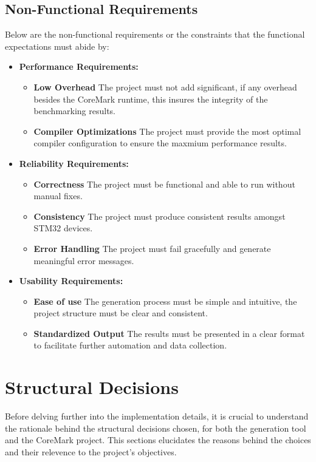 \subsection{Non-Functional Requirements}
Below are the non-functional requirements or the constraints that the functional expectations must abide by:
\begin{itemize}
    \item \textbf{Performance Requirements:}
    \begin{itemize}
        \item \textbf{Low Overhead} The project must not add significant, if any overhead besides the CoreMark runtime, this insures the integrity of the benchmarking results.
        \item \textbf{Compiler Optimizations} The project must provide the most optimal compiler configuration to ensure the maxmium performance results.
    \end{itemize}
   \item \textbf{Reliability Requirements:}
   \begin{itemize}
    \item \textbf{Correctness} The project must be functional and able to run without manual fixes.
    \item \textbf{Consistency} The project must produce consistent results amongst STM32 devices.
    \item \textbf{Error Handling} The project must fail gracefully and generate meaningful error messages.
   \end{itemize}
   \item \textbf{Usability Requirements:}
   \begin{itemize}
    \item \textbf{Ease of use} The generation process must be simple and intuitive, the project structure must be clear and consistent.
    \item \textbf{Standardized Output} The results must be presented in a clear format to facilitate further automation and data collection.
   \end{itemize}
\end{itemize}
\newpage

\section{Structural Decisions}
Before delving further into the implementation details, it is crucial to understand the rationale behind the structural decisions chosen, for both the generation tool and the CoreMark project. This sections elucidates the reasons behind the choices and their relevence to the project's objectives.
